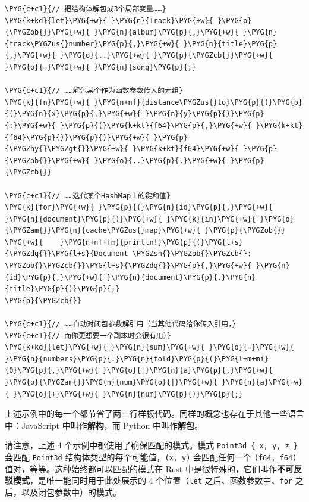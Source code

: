 \begin{Verbatim}[commandchars=\\\{\},breaklines=true,breakanywhere=true,fontsize=\codefont,xleftmargin=17bp]
\PYG{c+c1}{// 把结构体解包成3个局部变量……}
\PYG{k+kd}{let}\PYG{+w}{ }\PYG{n}{Track}\PYG{+w}{ }\PYG{p}{\PYGZob{}}\PYG{+w}{ }\PYG{n}{album}\PYG{p}{,}\PYG{+w}{ }\PYG{n}{track\PYGZus{}number}\PYG{p}{,}\PYG{+w}{ }\PYG{n}{title}\PYG{p}{,}\PYG{+w}{ }\PYG{o}{..}\PYG{+w}{ }\PYG{p}{\PYGZcb{}}\PYG{+w}{ }\PYG{o}{=}\PYG{+w}{ }\PYG{n}{song}\PYG{p}{;}

\PYG{c+c1}{// ……解包某个作为函数参数传入的元组}
\PYG{k}{fn}\PYG{+w}{ }\PYG{n+nf}{distance\PYGZus{}to}\PYG{p}{(}\PYG{p}{(}\PYG{n}{x}\PYG{p}{,}\PYG{+w}{ }\PYG{n}{y}\PYG{p}{)}\PYG{p}{:}\PYG{+w}{ }\PYG{p}{(}\PYG{k+kt}{f64}\PYG{p}{,}\PYG{+w}{ }\PYG{k+kt}{f64}\PYG{p}{)}\PYG{p}{)}\PYG{+w}{ }\PYG{p}{\PYGZhy{}\PYGZgt{}}\PYG{+w}{ }\PYG{k+kt}{f64}\PYG{+w}{ }\PYG{p}{\PYGZob{}}\PYG{+w}{ }\PYG{o}{..}\PYG{p}{.}\PYG{+w}{ }\PYG{p}{\PYGZcb{}}

\PYG{c+c1}{// ……迭代某个HashMap上的键和值}
\PYG{k}{for}\PYG{+w}{ }\PYG{p}{(}\PYG{n}{id}\PYG{p}{,}\PYG{+w}{ }\PYG{n}{document}\PYG{p}{)}\PYG{+w}{ }\PYG{k}{in}\PYG{+w}{ }\PYG{o}{\PYGZam{}}\PYG{n}{cache\PYGZus{}map}\PYG{+w}{ }\PYG{p}{\PYGZob{}}
\PYG{+w}{    }\PYG{n+nf+fm}{println!}\PYG{p}{(}\PYG{l+s}{\PYGZdq{}}\PYG{l+s}{Document \PYGZsh{}\PYGZob{}\PYGZcb{}: \PYGZob{}\PYGZcb{}}\PYG{l+s}{\PYGZdq{}}\PYG{p}{,}\PYG{+w}{ }\PYG{n}{id}\PYG{p}{,}\PYG{+w}{ }\PYG{n}{document}\PYG{p}{.}\PYG{n}{title}\PYG{p}{)}\PYG{p}{;}
\PYG{p}{\PYGZcb{}}

\PYG{c+c1}{// ……自动对闭包参数解引用（当其他代码给你传入引用，}
\PYG{c+c1}{// 而你更想要一个副本时会很有用）}
\PYG{k+kd}{let}\PYG{+w}{ }\PYG{n}{sum}\PYG{+w}{ }\PYG{o}{=}\PYG{+w}{ }\PYG{n}{numbers}\PYG{p}{.}\PYG{n}{fold}\PYG{p}{(}\PYG{l+m+mi}{0}\PYG{p}{,}\PYG{+w}{ }\PYG{o}{|}\PYG{n}{a}\PYG{p}{,}\PYG{+w}{ }\PYG{o}{\PYGZam{}}\PYG{n}{num}\PYG{o}{|}\PYG{+w}{ }\PYG{n}{a}\PYG{+w}{ }\PYG{o}{+}\PYG{+w}{ }\PYG{n}{num}\PYG{p}{)}\PYG{p}{;}
\end{Verbatim}

上述示例中的每一个都节省了两三行样板代码。同样的概念也存在于其他一些语言中：JavaScript 中叫作\textbf{解构}，而 Python 中叫作\textbf{解包}。

请注意，上述 4 个示例中都使用了确保匹配的模式。模式 \texttt{Point3d \{ x, y, z \}} 会匹配 \texttt{Point3d} 结构体类型的每个可能值，\texttt{(x, y)} 会匹配任何一个 \texttt{(f64, f64)} 值对，等等。这种始终都可以匹配的模式在 Rust 中是很特殊的，它们叫作\textbf{不可反驳模式}，是唯一能同时用于此处展示的 4 个位置（\texttt{let} 之后、函数参数中、\texttt{for} 之后，以及闭包参数中）的模式。


